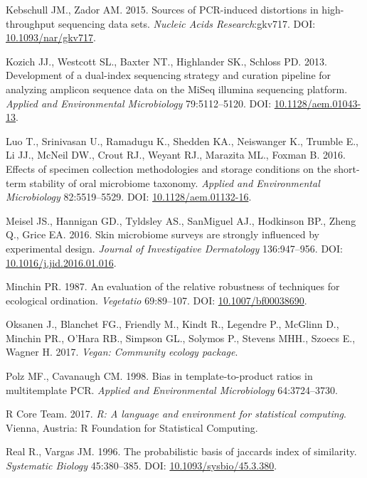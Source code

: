 \documentclass[12pt,]{article}
\begin{document}
\hypertarget{ref-Kebschull2015}{}
Kebschull JM., Zador AM. 2015. Sources of PCR-induced distortions in
high-throughput sequencing data sets. \emph{Nucleic Acids
Research}:gkv717. DOI:
\href{https://doi.org/10.1093/nar/gkv717}{10.1093/nar/gkv717}.

\hypertarget{ref-protocol_Kozich_2013}{}
Kozich JJ., Westcott SL., Baxter NT., Highlander SK., Schloss PD. 2013.
Development of a dual-index sequencing strategy and curation pipeline
for analyzing amplicon sequence data on the MiSeq illumina sequencing
platform. \emph{Applied and Environmental Microbiology} 79:5112--5120.
DOI: \href{https://doi.org/10.1128/aem.01043-13}{10.1128/aem.01043-13}.

\hypertarget{ref-preservation_Luo_2016}{}
Luo T., Srinivasan U., Ramadugu K., Shedden KA., Neiswanger K., Trumble
E., Li JJ., McNeil DW., Crout RJ., Weyant RJ., Marazita ML., Foxman B.
2016. Effects of specimen collection methodologies and storage
conditions on the short-term stability of oral microbiome taxonomy.
\emph{Applied and Environmental Microbiology} 82:5519--5529. DOI:
\href{https://doi.org/10.1128/aem.01132-16}{10.1128/aem.01132-16}.

\hypertarget{ref-Meisel2016}{}
Meisel JS., Hannigan GD., Tyldsley AS., SanMiguel AJ., Hodkinson BP.,
Zheng Q., Grice EA. 2016. Skin microbiome surveys are strongly
influenced by experimental design. \emph{Journal of Investigative
Dermatology} 136:947--956. DOI:
\href{https://doi.org/10.1016/j.jid.2016.01.016}{10.1016/j.jid.2016.01.016}.

\hypertarget{ref-bc_index_Minchin1987}{}
Minchin PR. 1987. An evaluation of the relative robustness of techniques
for ecological ordination. \emph{Vegetatio} 69:89--107. DOI:
\href{https://doi.org/10.1007/bf00038690}{10.1007/bf00038690}.

\hypertarget{ref-vegan_citation}{}
Oksanen J., Blanchet FG., Friendly M., Kindt R., Legendre P., McGlinn
D., Minchin PR., O'Hara RB., Simpson GL., Solymos P., Stevens MHH.,
Szoecs E., Wagner H. 2017. \emph{Vegan: Community ecology package}.

\hypertarget{ref-polz_bias_1998}{}
Polz MF., Cavanaugh CM. 1998. Bias in template-to-product ratios in
multitemplate PCR. \emph{Applied and Environmental Microbiology}
64:3724--3730.

\hypertarget{ref-r_citation_2017}{}
R Core Team. 2017. \emph{R: A language and environment for statistical
computing}. Vienna, Austria: R Foundation for Statistical Computing.

\hypertarget{ref-Real1996}{}
Real R., Vargas JM. 1996. The probabilistic basis of jaccards index of
similarity. \emph{Systematic Biology} 45:380--385. DOI:
\href{https://doi.org/10.1093/sysbio/45.3.380}{10.1093/sysbio/45.3.380}.
\end{document}
